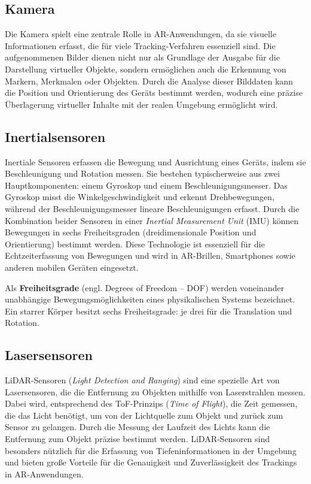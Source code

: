 \subsection{Kamera}

Die Kamera spielt eine zentrale Rolle in AR-Anwendungen, da sie visuelle Informationen erfasst, die für viele Tracking-Verfahren essenziell sind. Die aufgenommenen Bilder dienen nicht nur als Grundlage der Ausgabe für die Darstellung virtueller Objekte, sondern ermöglichen auch die Erkennung von Markern, Merkmalen oder Objekten. Durch die Analyse dieser Bilddaten kann die Position und Orientierung des Geräts bestimmt werden, wodurch eine präzise Überlagerung virtueller Inhalte mit der realen Umgebung ermöglicht wird. \cite{doerner2022virtual}

\subsection{Inertialsensoren}

Inertiale Sensoren erfassen die Bewegung und Ausrichtung eines Geräts, indem sie Beschleunigung und Rotation messen. Sie bestehen typischerweise aus zwei Hauptkomponenten: einem Gyroskop und einem Beschleunigungsmesser. Das Gyroskop misst die Winkelgeschwindigkeit und erkennt Drehbewegungen, während der Beschleunigungsmesser lineare Beschleunigungen erfasst. Durch die Kombination beider Sensoren in einer \emph{Inertial Measurement Unit} (IMU) können Bewegungen in sechs Freiheitsgraden (dreidimensionale Position und Orientierung) bestimmt werden. Diese Technologie ist essenziell für die Echtzeiterfassung von Bewegungen und wird in AR-Brillen, Smartphones sowie anderen mobilen Geräten eingesetzt. \cite{doerner2022virtual}

\begin{tcolorbox}[colback=THAi-Blue!20!white, colframe=THAi-Blue]
    Als \textbf{Freiheitsgrade} (engl. Degrees of Freedom – DOF) werden voneinander unabhängige Bewegungsmöglichkeiten eines physikalischen Systems bezeichnet. Ein starrer Körper besitzt sechs Freiheitsgrade: je drei für die Translation und Rotation. \cite{wikipedia2024dof}
\end{tcolorbox}

\subsection{Lasersensoren}\label{LiDAR}

LiDAR-Sensoren (\emph{Light Detection and Ranging}) sind eine spezielle Art von Lasersensoren, die die Entfernung zu Objekten mithilfe von Laserstrahlen messen. Dabei wird, entsprechend des ToF-Prinzips (\emph{Time of Flight}), die Zeit gemessen, die das Licht benötigt, um von der Lichtquelle zum Objekt und zurück zum Sensor zu gelangen. Durch die Messung der Laufzeit des Lichts kann die Entfernung zum Objekt präzise bestimmt werden. LiDAR-Sensoren sind besonders nützlich für die Erfassung von Tiefeninformationen in der Umgebung und bieten große Vorteile für die Genauigkeit und Zuverlässigkeit des Trackings in AR-Anwendungen. \cite{doerner2022virtual, ibm2024lidar}

